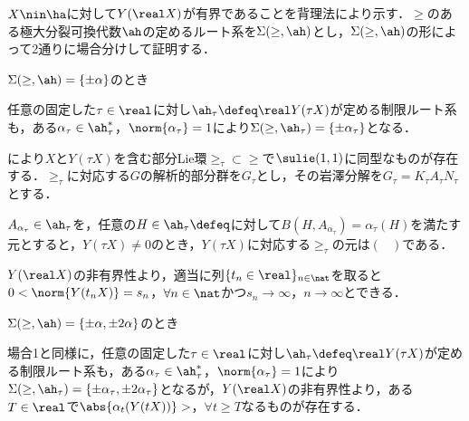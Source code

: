 \begin{pfwn}{}

  $X\nin \ha$に対して$Y(\real X)$が有界であることを背理法により示す．$\ge$のある極大分裂可換代数$\ah$の定めるルート系を$\Sigma(\ge,\ah) $とし，$\Sigma(\ge,\ah) $の形によって2通りに場合分けして証明する．
  
  \begin{case}
    $\Sigma(\ge,\ah) = \{\pm\alpha \}$のとき

    任意の固定した$\tau \in \real$に対し$\ah_{\tau} \defeq \real Y(\tau X)$が定める制限ルート系も，ある$\alpha_{\tau} \in \ah_{\tau}^{*}$，$ \norm{\alpha_{\tau}} = 1 $により$\Sigma(\ge,\ah_{\tau}) = \{\pm\alpha_{\tau} \}$となる．

    により$X$と$Y(\tau X) $を含む部分Lie環$\ge_{\tau} \subset \ge $で$\sulie(1,1) $に同型なものが存在する．$\ge_{\tau} $に対応する$G$の解析的部分群を$G_{\tau}$とし，その岩澤分解を$G_{\tau} = K_{\tau}A_{\tau}N_{\tau} $とする．
    
    $A_{\alpha_{\tau}}\in \ah_{\tau} $を，任意の$H\in \ah_{\tau}\defeq  $に対して$B(H,A_{\alpha_{\tau}}) = \alpha_{\tau}(H) $を満たす元とすると，$Y(\tau X)\neq 0 $のとき，$Y(\tau X) $に対応する$\ge_{\tau} $の元は$
    \begin{pmatrix}
      
    \end{pmatrix}
    $である．
    
    $Y(\real X) $の非有界性より，適当に列$\{t_{n}\in \real\}_{n\in \nat} $を取ると$0 <  \norm{Y(t_n X)} = s_n $，$\forall n\in \nat$かつ$s_n\to \infty$，$n\to \infty$とできる．

    
    
  \end{case}

  \begin{case}
    $\Sigma(\ge,\ah) = \{\pm\alpha,\pm 2\alpha \}$のとき

    場合1と同様に，任意の固定した$\tau \in \real$に対し$\ah_{\tau} \defeq \real Y(\tau X)$が定める制限ルート系も，ある$\alpha_{\tau} \in \ah_{\tau}^{*}$，$ \norm{\alpha_{\tau}} = 1 $により$\Sigma(\ge,\ah_{\tau}) = \{\pm\alpha_{\tau}, \pm 2\alpha_{\tau} \}$となるが，$Y(\real X) $の非有界性より，ある$T\in \real$で$\abs{\alpha_{t}(Y(tX))} >  $，$\forall t \geq T$なるものが存在する．
    
    
  \end{case}
  
\end{pfwn}


